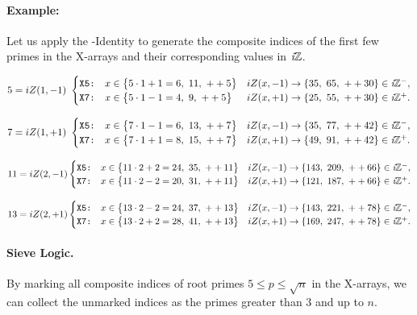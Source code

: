 \documentclass{article}
\begin{document}
\paragraph{Example:} Let us apply the \Xp-Identity to generate the composite indices of the first few primes in the X-arrays and their corresponding values in $\textit{i}\mathbb{Z}$.

\( 
5 = iZ(1, -1) \ 
\begin{cases}        
    \texttt{X5:} \quad x \in \big\{5 \cdot 1 + 1 = 6,\ 11,\ ++5 \big\} & iZ(x, -1) \rightarrow \{35,\  65,\ ++30\} \in\iZ^-,\\
    \texttt{X7:} \quad x \in \big\{5 \cdot 1 - 1 = 4,\ 9,\ ++5 \big\} & iZ(x, +1) \rightarrow \{25,\  55,\ ++30\} \in\iZ^+.
\end{cases}
\)

\( 
7 = iZ(1, +1) \
\begin{cases}        
    \texttt{X5:} \quad x \in \big\{7 \cdot 1 - 1 = 6,\ 13,\ ++7 \big\} & iZ(x, -1) \rightarrow \{35,\  77,\ ++42\} \in\textit{i}\mathbb{Z}^-,\\
    \texttt{X7:} \quad x \in \big\{7 \cdot 1 + 1 = 8,\ 15,\ ++7 \big\} & iZ(x, +1) \rightarrow \{49,\  91,\ ++42\} \in\textit{i}\mathbb{Z}^+.
\end{cases}
\)

\( 
11 = iZ(2, -1) 
\begin{cases}        
    \texttt{X5:} \quad x \in \big\{11 \cdot 2 + 2 = 24,\ 35,\ ++11 \big\} & iZ(x, -1) \rightarrow \{143,\  209,\ ++66\} \in\textit{i}\mathbb{Z}^-,\\
    \texttt{X7:} \quad x \in \big\{11 \cdot 2 - 2 = 20,\ 31,\ ++11 \big\} & iZ(x, +1) \rightarrow \{121,\  187,\ ++66\} \in\textit{i}\mathbb{Z}^+.
\end{cases}
\)

\( 
13 = iZ(2, +1)
\begin{cases}        
    \texttt{X5:} \quad x \in \big\{13 \cdot 2 - 2 = 24,\ 37,\ ++13 \big\} & iZ(x, -1) \rightarrow \{143,\  221,\ ++78\} \in\textit{i}\mathbb{Z}^-,\\
    \texttt{X7:} \quad x \in \big\{13 \cdot 2 + 2 = 28,\ 41,\ ++13 \big\} & iZ(x, +1) \rightarrow \{169,\  247,\ ++78\} \in\textit{i}\mathbb{Z}^+.
\end{cases}
\)

\paragraph{Sieve Logic.}
By marking all composite indices of root primes $5 \le p \le \sqrt{n}$ in the X-arrays, we can collect the unmarked indices as the primes greater than 3 and up to $n$. 
\end{document}
